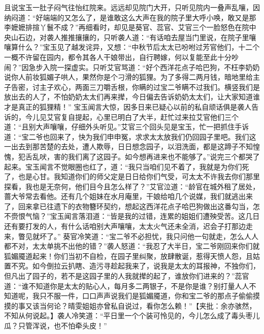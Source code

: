 \documentclass[12pt,oneside]{book}
\begin{document}
且说宝玉一肚子闷气往怡红院来。远远却见院门大开，只听见院内一叠声乱嚷，因纳闷道：“好端端的又怎么了，是谁敢这么大声在我的院子里大呼小唤，敢又是那李嬷嬷排揎丫鬟不成？”再细看时，却见是葵官、蕊官、艾官三个一脸怒色在院中央山石边，对袭人推推攘攘的，只听袭人道：“有话咱去屋当门里说，在院子里嚷嚷算什么？”宝玉见了越发诧异，又想：“中秋节后太太已吩咐过芳官他们，十二个一概不许留在园内，都令其各人干娘带出，自行聘嫁，何以复能至此十分吵闹？”因急步入院一探虚实。只听艾官骂道：“好个西洋花点子哈巴狗，不枉李奶奶说你人前妆狐媚子哄人，果然你是个刁滑的狐狸。为了多得二两月钱，暗地里给主子告密，讨主子欢心，两面三刀嚼舌根，你瞒的过宝二爷瞒不过我们。横竖我们是放出去的人了，不怕奶奶太太们再来撵，今日偏去告诉奶奶太太们，让大家知道谁才是真正的狐狸精！”
宝玉闻言大惊，因多日来已疑心以前的私自顽话俱是袭人告诉的，今儿见艾官复自提起，心里已明白了大半，赶忙过来拉艾官他们三个道：“且别大声嚷嚷，仔细外头听见。”艾官三个回头见是宝玉，忙一把抓住手诉道：“宝二爷也回来了，快为我们申申冤，求求太太放我们仍回园子里吧。我们这一出去到那苦楚的去处，遭人欺辱，日日想念园子，以泪洗面，都是这蹄子不知惶愧，犯舌乱吠，害的我们离了这园子。如今想再进来也不能够了。”说完三个都哭了起来。宝玉闻言不觉眼圈也红了，道：“我只当咱们见不着了，我就是为你们死了，也是心甘。我知道你们的师父定是日日给你们气受，可太太不许我去你们那里探看，我也是无奈何，他们目今且怎么样了？”艾官泣道：“龄官在城外租了居处，蔷大爷常去看他。还有几个姐妹在水月庵里，干娘给咱几个说媒，我们就逃出来了，回来拿已往遗下的衣物簪环契约，想起这西洋花点子哈巴狗做出这番勾当，怎不赍恨气恼？”宝玉闻言落泪道：“皆是我的过错，连累的姐姐们遭殃受苦。这几日还有要打发的人，有什么话咱别大声嚷嚷，太太火气还未全消，迟会子打那边走来，瞥见就坏了。”
葵官冷笑道：“宝二爷不必担忧，我只问他一句就走，怎么人人都不对，太太单挑不出他的错？”袭人怒道：“我忍了大半日，宝二爷刚回来你们就狐媚魇道起来！你们当初不自检，在园子里纠聚，放肆散诞，惹得天愤人怨，且姑置不究。如今倒拉云扒瞎、造污寻趁起我来了，说我是太太的耳报神，不独你们，但凡出了园子的，若不是这园子里的人我就撵的起了，谁放你们进来的？”蕊官道：“谁不知道你是太太的贴心人，每月多二两银子，不是你是谁？别打量人人不知道呢，我只不服一件，口口声声说我们是狐媚魇道，你和宝二爷的那点子偷偷摸摸的事又该当何论？晴雯姐姐亦曾私自说过，看你怎么赖！”【夹批：余亦骇然，不知从何说起。】袭人冷笑道：“平日里一个个装可怜见的，今儿怎么成了毒头枣儿瓜？只管浑说，也不怕牵头皮！”
\end{document}
